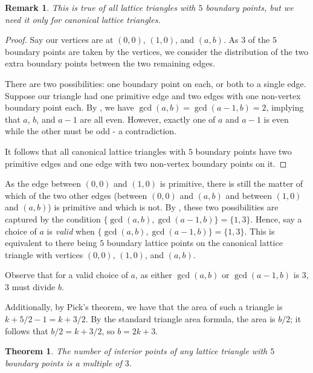 \documentclass{article}
\theoremstyle{mydefstyle}
\newtheorem{theorem}{Theorem}
\newtheorem*{remark}{Remark}
\begin{document}
\begin{remark}This is true of all lattice triangles with $5$ boundary points, but we need it only for canonical lattice triangles.\end{remark}

\begin{proof}
Say our vertices are at $(0,0)$, $(1,0)$, and $(a,b)$. As $3$ of the $5$ boundary points are taken by the vertices, we consider the distribution of the two extra boundary points between the two remaining edges. 

There are two possibilities: one boundary point on each, or both to a single edge. Suppose our triangle had one primitive edge and two edges with one non-vertex boundary point each. By , we have $\gcd(a,b)=\gcd(a-1,b)=2$, implying that $a$, $b$, and $a-1$ are all even. However, exactly one of $a$ and $a-1$ is even while the other must be odd - a contradiction. 

It follows that all canonical lattice triangles with $5$ boundary points have two primitive edges and one edge with two non-vertex boundary points on it. 
\end{proof}

As the edge between $(0,0)$ and $(1,0)$ is primitive, there is still the matter of which of the two other edges (between $(0,0)$ and $(a,b)$ and between $(1,0)$ and $(a,b)$) is primitive and which is not. By , these two possibilities are captured by the condition $\{\gcd(a,b),\gcd(a-1,b)\}=\{1,3\}$. Hence, say a choice of $a$ is \textit{valid} when $\{\gcd(a,b),\gcd(a-1,b)\}=\{1,3\}$. This is equivalent to there being $5$ boundary lattice points on the canonical lattice triangle with vertices $(0,0)$, $(1,0)$, and $(a,b)$. 

Observe that for a valid choice of $a$, as either $\gcd(a,b)$ or $\gcd(a-1,b)$ is $3$, $3$ must divide $b$. 

Additionally, by Pick's theorem, we have that the area of such a triangle is $k+5/2-1=k+3/2$. By the standard triangle area formula, the area is $b/2$; it follows that $b/2=k+3/2$, so $b=2k+3$. 

\begin{theorem}
\label{notonetwo:label}
The number of interior points of any lattice triangle with $5$ boundary points is a multiple of $3$. 
\end{theorem}
\end{document}
